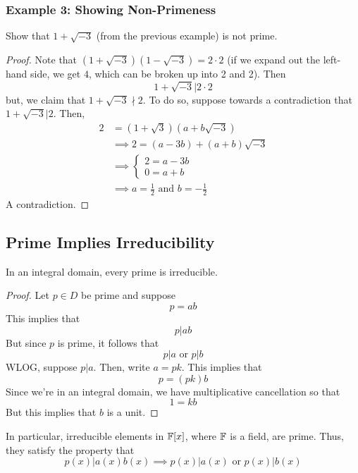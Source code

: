 \documentclass[letterpaper]{article}
\begin{document}
\subsubsection{Example 3: Showing Non-Primeness}
Show that $1 + \sqrt{-3}$ (from the previous example) is not prime. 
\begin{mdframed}[]
    \begin{proof}
        Note that $(1 + \sqrt{-3})(1 - \sqrt{-3}) = 2 \cdot 2$ (if we expand out the left-hand side, we get $4$, which can be broken up into 2 and 2). Then 
        \[1 + \sqrt{-3} | 2 \cdot 2\]
        but, we claim that $1 + \sqrt{-3} \nmid 2$. To do so, suppose towards a contradiction that $1 + \sqrt{-3} | 2$. Then, 
        \begin{equation*}
            \begin{aligned}
                2 &= (1 + \sqrt{3})(a + b\sqrt{-3}) \\ 
                    &\implies 2 = (a - 3b) + (a + b)\sqrt{-3} \\ 
                    &\implies \begin{cases}
                        2 = a - 3b \\ 
                        0 = a + b
                    \end{cases} \\ 
                    &\implies a = \frac{1}{2} \text{ and } b = -\frac{1}{2}
            \end{aligned}
        \end{equation*}
        A contradiction. 
    \end{proof}
\end{mdframed}

\subsection{Prime Implies Irreducibility}
\begin{theorem}{}{}
    In an integral domain, every prime is irreducible. 
\end{theorem}

\begin{mdframed}[]
    \begin{proof}
        Let $p \in D$ be prime and suppose 
        \[p = ab\]
        This implies that 
        \[p | ab\]
        But since $p$ is prime, it follows that 
        \[p | a \text{ or } p | b\]
        WLOG, suppose $p | a$. Then, write $a = pk$. This implies that 
        \[p = (pk)b\]
        Since we're in an integral domain, we have multiplicative cancellation so that 
        \[1 = kb\]
        But this implies that $b$ is a unit. 
    \end{proof}
\end{mdframed}
In particular, irreducible elements in $\mathbb{F}[x]$, where $\mathbb{F}$ is a field, are prime. Thus, they satisfy the property that 
\[p(x) | a(x)b(x) \implies p(x) | a(x) \text{ or } p(x) | b(x)\]
\end{document}
